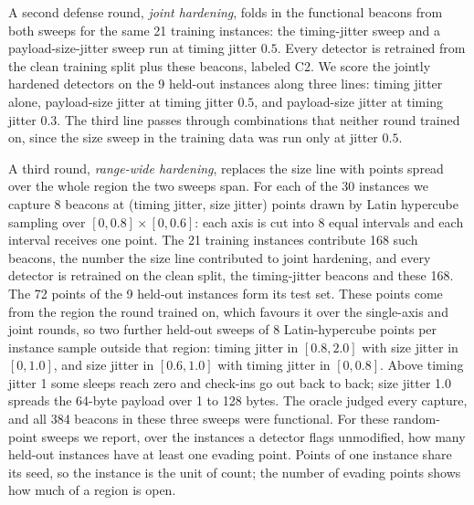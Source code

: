 \documentclass[preprint,12pt]{elsarticle}
\begin{document}
A second defense round, \emph{joint hardening}, folds in the functional beacons from both sweeps for
the same 21 training instances: the timing-jitter sweep and a payload-size-jitter sweep run at timing
jitter $0.5$. Every detector is retrained from the clean training split plus these beacons, labeled C2.
We score the jointly hardened detectors on the 9 held-out instances along three lines: timing jitter
alone, payload-size jitter at timing jitter $0.5$, and payload-size jitter at timing jitter $0.3$. The
third line passes through combinations that neither round trained on, since the size sweep in the
training data was run only at jitter $0.5$.

A third round, \emph{range-wide hardening}, replaces the size line with points spread over the whole
region the two sweeps span. For each of the 30 instances we capture 8 beacons at (timing jitter, size
jitter) points drawn by Latin hypercube sampling over $[0, 0.8] \times [0, 0.6]$: each axis is cut into 8
equal intervals and each interval receives one point. The 21 training instances contribute 168 such
beacons, the number the size line contributed to joint hardening, and every detector is retrained on
the clean split, the timing-jitter beacons and these 168. The 72 points of the 9 held-out instances form
its test set. These points come from the region the round trained on, which favours it over the
single-axis and joint rounds, so two further held-out sweeps of 8 Latin-hypercube points per instance
sample outside that region: timing jitter in $[0.8, 2.0]$ with size jitter in $[0, 1.0]$, and size
jitter in $[0.6, 1.0]$ with timing jitter in $[0, 0.8]$. Above timing jitter 1 some sleeps reach zero
and check-ins go out back to back; size jitter 1.0 spreads the 64-byte payload over 1 to 128 bytes. The
oracle judged every capture, and all 384 beacons in these three sweeps were functional. For these
random-point sweeps we report, over the instances a detector flags unmodified, how many held-out
instances have at least one evading point. Points of one instance share its seed, so the instance is
the unit of count; the number of evading points shows how much of a region is open.
\end{document}
